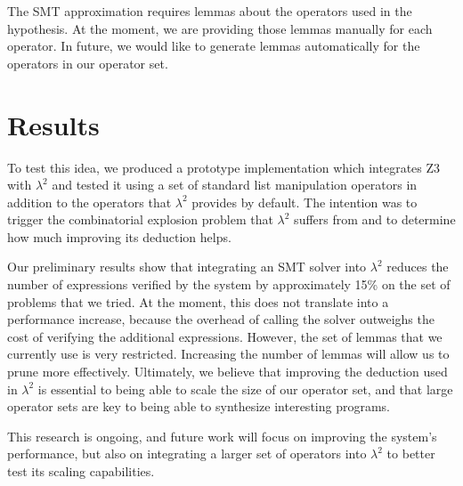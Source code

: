 \documentclass[11pt]{article}
\newcommand{\sys}{$\lambda^2$\xspace}
\begin{document}
The SMT approximation requires lemmas about the operators used in the
hypothesis. At the moment, we are providing those lemmas manually for
each operator. In future, we would like to generate lemmas
automatically for the operators in our operator set.

\section{Results}
\label{sec-4}

To test this idea, we produced a prototype implementation which
integrates Z3~\cite{z3} with \sys and tested it using a set of
standard list manipulation operators in addition to the operators that
\sys provides by default. The intention was to trigger the
combinatorial explosion problem that \sys suffers from and to
determine how much improving its deduction helps.

Our preliminary results show that integrating an SMT solver into \sys
reduces the number of expressions verified by the system by
approximately 15\% on the set of problems that we tried. At the
moment, this does not translate into a performance increase, because
the overhead of calling the solver outweighs the cost of verifying the
additional expressions. However, the set of lemmas that we currently
use is very restricted. Increasing the number of lemmas will allow us
to prune more effectively. Ultimately, we believe that improving the
deduction used in \sys is essential to being able to scale the size of
our operator set, and that large operator sets are key to being able
to synthesize interesting programs.

This research is ongoing, and future work will focus on improving the
system's performance, but also on integrating a larger set of
operators into \sys to better test its scaling capabilities.



\end{document}
